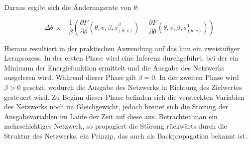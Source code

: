 Daraus ergibt sich die Änderungsrate von \(\theta\):

\[\Delta\theta\propto -\frac{1}{\beta}\left(\frac{\partial F}{\partial \theta}(\theta,v,\beta,s_{(\theta,v)}^\beta)-\frac{\partial F}{\partial \theta}(\theta,v,\beta,s_{(\theta,v)}^0)\right)\]

Hieraus resultiert in der praktischen Anwendung auf das \ac{hnn} ein zweistufiger Lernprozess. In der ersten Phase wird eine Inferenz durchgeführt, bei der ein Minimum der Energiefunktion ermittelt und die Ausgabe des Netzwerks ausgelesen wird. Während dieser Phase gilt \(\beta=0\). In der zweiten Phase wird \(\beta>0\) gesetzt, wodurch die Ausgabe des Netzwerks in Richtung des Zielwertes gesteuert wird. Zu Beginn dieser Phase befinden sich die versteckten Variablen des Netzwerks noch im Gleichgewicht, jedoch breitet sich die Störung der Ausgabevariablen im Laufe der Zeit auf diese aus. Betrachtet man ein mehrschichtiges Netzwerk, so propagiert die Störung rückwärts durch die Struktur des Netzwerks, ein Prinzip, das auch als Backpropagation bekannt ist. \cite{Scellier2017}
